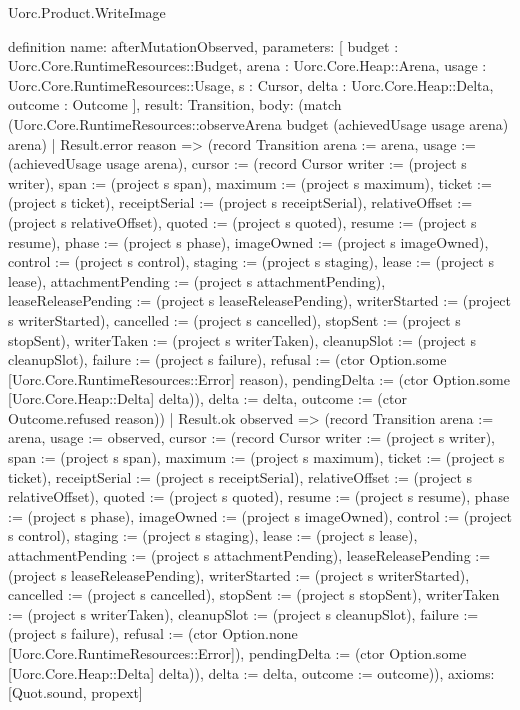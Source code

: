 \begin{lexlean}{Uorc.Product.WriteImage}
\begin{semanticmodule}
definition{
  name: afterMutationObserved,
  parameters: [
    budget : Uorc.Core.RuntimeResources::Budget,
    arena : Uorc.Core.Heap::Arena,
    usage : Uorc.Core.RuntimeResources::Usage,
    s : Cursor,
    delta : Uorc.Core.Heap::Delta,
    outcome : Outcome
  ],
  result: Transition,
  body: (match (Uorc.Core.RuntimeResources::observeArena budget (achievedUsage usage arena) arena)
    | Result.error reason => (record Transition {arena := arena, usage := (achievedUsage usage arena), cursor := (record Cursor {writer := (project s writer), span := (project s span), maximum := (project s maximum), ticket := (project s ticket), receiptSerial := (project s receiptSerial), relativeOffset := (project s relativeOffset), quoted := (project s quoted), resume := (project s resume), phase := (project s phase), imageOwned := (project s imageOwned), control := (project s control), staging := (project s staging), lease := (project s lease), attachmentPending := (project s attachmentPending), leaseReleasePending := (project s leaseReleasePending), writerStarted := (project s writerStarted), cancelled := (project s cancelled), stopSent := (project s stopSent), writerTaken := (project s writerTaken), cleanupSlot := (project s cleanupSlot), failure := (project s failure), refusal := (ctor Option.some [Uorc.Core.RuntimeResources::Error] reason), pendingDelta := (ctor Option.some [Uorc.Core.Heap::Delta] delta)}), delta := delta, outcome := (ctor Outcome.refused reason)})
    | Result.ok observed => (record Transition {arena := arena, usage := observed, cursor := (record Cursor {writer := (project s writer), span := (project s span), maximum := (project s maximum), ticket := (project s ticket), receiptSerial := (project s receiptSerial), relativeOffset := (project s relativeOffset), quoted := (project s quoted), resume := (project s resume), phase := (project s phase), imageOwned := (project s imageOwned), control := (project s control), staging := (project s staging), lease := (project s lease), attachmentPending := (project s attachmentPending), leaseReleasePending := (project s leaseReleasePending), writerStarted := (project s writerStarted), cancelled := (project s cancelled), stopSent := (project s stopSent), writerTaken := (project s writerTaken), cleanupSlot := (project s cleanupSlot), failure := (project s failure), refusal := (ctor Option.none [Uorc.Core.RuntimeResources::Error]), pendingDelta := (ctor Option.some [Uorc.Core.Heap::Delta] delta)}), delta := delta, outcome := outcome})),
  axioms: [Quot.sound, propext]
}


\end{semanticmodule}
\end{lexlean}
